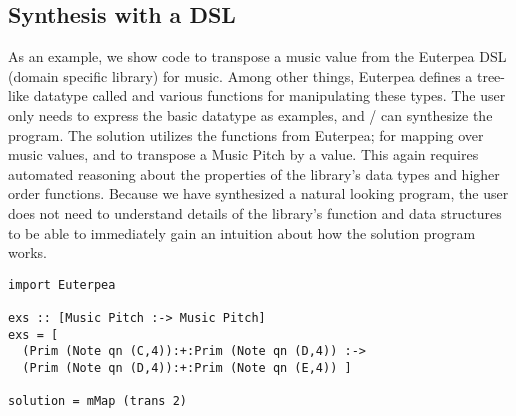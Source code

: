 \subsection{Synthesis with a DSL}

As an example, we show code to transpose a music value from the Euterpea DSL (domain specific library) for music\cite{euterpea}.
Among other things, Euterpea defines a tree-like datatype called  and various functions for manipulating these types.
The user only needs to express the basic datatype as examples, and \ourTool/ can synthesize the  program.
The solution utilizes the functions from Euterpea;  for mapping over music values, and  to transpose a Music Pitch by a value.
This again requires automated reasoning about the properties of the library's data types and higher order functions.
Because we have synthesized a natural looking program, the user does not need to understand details of the library's function and data structures to be able to immediately gain an intuition about how the solution program works.

\begin{lstlisting}
import Euterpea

exs :: [Music Pitch :-> Music Pitch]
exs = [
  (Prim (Note qn (C,4)):+:Prim (Note qn (D,4)) :->
  (Prim (Note qn (D,4)):+:Prim (Note qn (E,4)) ]
        
solution = mMap (trans 2)
\end{lstlisting}


